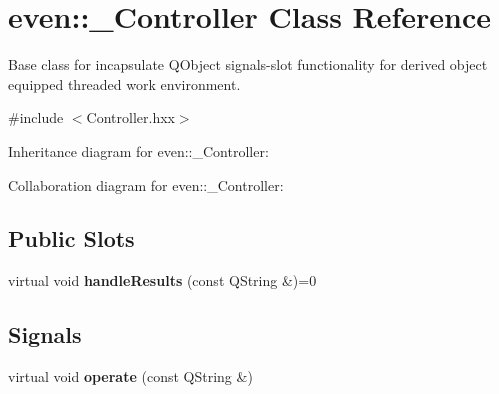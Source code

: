 \hypertarget{classeven_1_1___controller}{}\section{even\+:\+:\+\_\+\+Controller Class Reference}
\label{classeven_1_1___controller}


Base class for incapsulate Q\+Object signals-\/slot functionality for derived object equipped threaded work environment.  




{\ttfamily \#include $<$Controller.\+hxx$>$}



Inheritance diagram for even\+:\+:\+\_\+\+Controller\+:


Collaboration diagram for even\+:\+:\+\_\+\+Controller\+:
\subsection*{Public Slots}
\begin{DoxyCompactItemize}
\item 
\mbox{\label{classeven_1_1___controller_a5e01606799c4e0d921a5f674a4f0badb}} 
virtual void {\bfseries handle\+Results} (const Q\+String \&)=0
\end{DoxyCompactItemize}
\subsection*{Signals}
\begin{DoxyCompactItemize}
\item 
\mbox{\label{classeven_1_1___controller_a26dcb63fe32cb98755c21f9dd5c6a698}} 
virtual void {\bfseries operate} (const Q\+String \&)
\end{DoxyCompactItemize}
